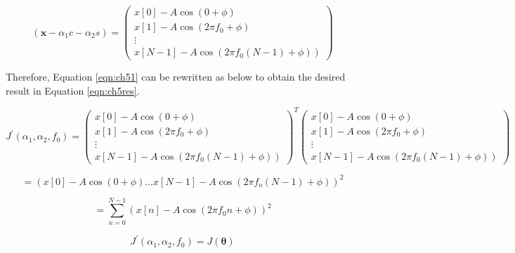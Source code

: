 \vspace{-0.2cm}
\begin{center}
\begin{equation}
\left(\boldsymbol{x}-\alpha_{1} c-\alpha_{2} s\right)=
\left(\begin{array}{c}
x[0]-A \cos (0+\phi) \\
x[1]-A \cos \left(2 \pi f_{0}+\phi\right) \\
\vdots \\
\left.x[N-1]-A \cos \left(2 \pi f_{0}(N-1)+\phi\right)\right)
\end{array}\right)
\label{eqn:ch53}
\end{equation}
\end{center}

\noindent
\begin{flushleft}
Therefore, Equation \ref{eqn:ch51} can be rewritten as below to obtain the desired result in Equation \ref{eqn:ch5res}.
\end{flushleft}
\vspace{-0.5cm}
\begin{center}
\begin{equation}
J^{\prime}\left(\alpha_{1}, \alpha_{2}, f_{0}\right)= \left(\begin{array}{c}
x[0]-A \cos (0+\phi) \\
x[1]-A \cos \left(2 \pi f_{0}+\phi\right) \\
\vdots \\
\left.x[N-1]-A \cos \left(2 \pi f_{0}(N-1)+\phi\right)\right)
\end{array}\right)^{T}\left(\begin{array}{c}
x[0]-A \cos (0+\phi) \\
x[1]-A \cos \left(2 \pi f_{0}+\phi\right) \\
\vdots \\
\left.x[N-1]-A \cos \left(2 \pi f_{0}(N-1)+\phi\right)\right)
\end{array}\right)
\end{equation}
\end{center}
\vspace{-0.4cm}
\begin{center}
\begin{equation}
=\left(x[0]-A \cos (0+\phi) \ldots x[N-1]-A \cos \left(2 \pi f_{o}(N-1)+\phi\right)\right)^{2}
\end{equation}
\end{center}
\vspace{-1cm}
\begin{center}
\begin{equation}
=\sum_{n=0}^{N-1}\left(x[n]-A \cos \left(2 \pi f_{0} n+\phi\right)\right)^{2}
\end{equation}
\end{center}
\vspace{-0.8cm}
\begin{center}
\begin{equation}
J^{\prime}\left(\alpha_{1}, \alpha_{2}, f_{0}\right)=J(\boldsymbol{\theta})
\label{eqn:ch5res}
\end{equation}
\end{center}

